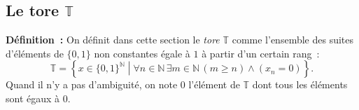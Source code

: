 \done

\subsection{Le tore \texorpdfstring{$\mathbb{T}$}{T}}

\noindent\textbf{Définition :} On définit dans cette section le \emph{tore} $\mathbb{T}$ comme l'ensemble des suites d'éléments de $\lbrace 0, 1 \rbrace$ non constantes égale à $1$ à partir d'un certain rang : 
\begin{equation*}
    \mathbb{T} = \left\lbrace
        x \in \lbrace 0, 1 \rbrace^{\mathbb{N}} 
        \middle\vert
        \forall n \in \mathbb{N} \, \exists m \in \mathbb{N} \, (m \geq n) \wedge (x_n = 0)
    \right\rbrace .
\end{equation*}
Quand il n'y a pas d'ambiguité, on note $0$ l'élément de $\mathbb{T}$ dont tous les éléments sont égaux à $0$.

